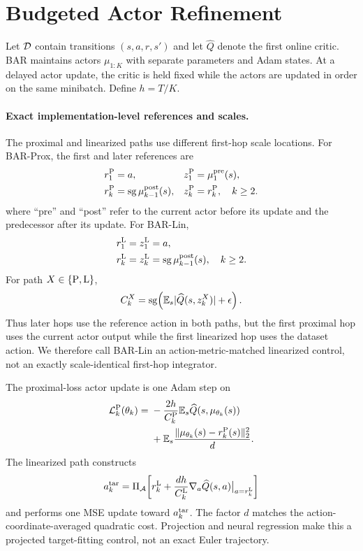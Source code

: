 \section{Budgeted Actor Refinement}
\label{sec:method}

Let $\mathcal D$ contain transitions $(s,a,r,s')$ and let $\widehat Q$ denote the first online critic. BAR maintains actors $\mu_{1:K}$ with separate parameters and Adam states. At a delayed actor update, the critic is held fixed while the actors are updated in order on the same minibatch. Define $h=T/K$.

\paragraph{Exact implementation-level references and scales.}
The proximal and linearized paths use different first-hop scale locations. For BAR-Prox, the first and later references are
\begin{align}
 r^{\rm P}_1&=a, & z^{\rm P}_1&=\mu^{\rm pre}_1(s),\label{eq:prox_refs_a}\\
 r^{\rm P}_k&=\operatorname{sg}\mu^{\rm post}_{k-1}(s), & z^{\rm P}_k&=r^{\rm P}_k,\quad k\ge2.\label{eq:prox_refs_b}
\end{align}
where ``pre'' and ``post'' refer to the current actor before its update and the predecessor after its update. For BAR-Lin,
\begin{align}
 r^{\rm L}_1&=z^{\rm L}_1=a,\label{eq:lin_refs_a}\\
 r^{\rm L}_k&=z^{\rm L}_k=\operatorname{sg}\mu^{\rm post}_{k-1}(s),\quad k\ge2.\label{eq:lin_refs_b}
\end{align}
For path $X\in\{\rm P,L\}$,
\begin{equation}
 C^X_k=\operatorname{sg}\!\left(\mathbb E_s|\widehat Q(s,z^X_k)|+\epsilon\right).
\label{eq:qscale}
\end{equation}
Thus later hops use the reference action in both paths, but the first proximal hop uses the current actor output while the first linearized hop uses the dataset action. We therefore call BAR-Lin an action-metric-matched linearized control, not an exactly scale-identical first-hop integrator.

The proximal-loss actor update is one Adam step on
\begin{equation}
\begin{split}
 \mathcal L^{\rm P}_{k}(\theta_k)
 ={}&-\frac{2h}{C^{\rm P}_k}\mathbb E_s\widehat Q(s,\mu_{\theta_k}(s))\\
 &+\mathbb E_s\frac{\|\mu_{\theta_k}(s)-r^{\rm P}_k(s)\|_2^2}{d}.
\end{split}
\label{eq:prox_loss}
\end{equation}
The linearized path constructs
\begin{equation}
 a_k^{\rm tar}=\Pi_{\mathcal A}\!\left[r^{\rm L}_k
 +\frac{dh}{C^{\rm L}_k}\nabla_a\widehat Q(s,a)\big|_{a=r^{\rm L}_k}\right]
\label{eq:lin_target}
\end{equation}
and performs one MSE update toward $a_k^{\rm tar}$. The factor $d$ matches the action-coordinate-averaged quadratic cost. Projection and neural regression make this a projected target-fitting control, not an exact Euler trajectory.

